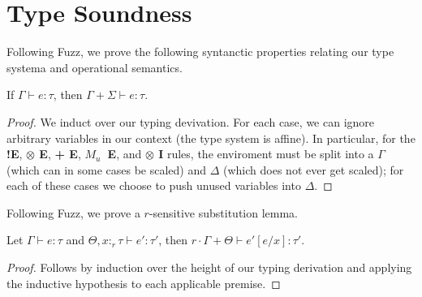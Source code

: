 \section{Type Soundness}
Following Fuzz, we prove the following syntanctic properties relating our type
systema and operational semantics.

\begin{lemma}[Weakening]\label{thm:weakening}
  If $\Gamma \vdash e : \tau$, then $\Gamma + \Sigma \vdash e : \tau$.
\end{lemma}
\begin{proof}
  We induct over our typing devivation. 
  For each case, we can ignore arbitrary variables in our context (the type system is
  affine). 
  In particular, for the \textbf{!E}, \textbf{$\otimes$ E}, \textbf{+ E},
  \textbf{$M_u$~E}, and \textbf{$\otimes$ I} rules, the enviroment must be split
  into a $\Gamma$ (which can in some cases be scaled) and $\Delta$ (which does
  not ever get scaled); for each of these cases we choose to push unused
  variables into $\Delta$. 
\end{proof}

Following Fuzz, we prove a $r$-sensitive substitution lemma.
\begin{lemma}\label{thm:substitution}
  Let $\Gamma \vdash e : \tau$ and $\Theta, x :_r \tau \vdash e' : \tau'$, then 
  $r \cdot \Gamma + \Theta \vdash e'[e/x] : \tau'$.
\end{lemma}
\begin{proof}
  Follows by induction over the height of our typing derivation and applying the
  inductive hypothesis to each applicable premise.
\end{proof}


%
